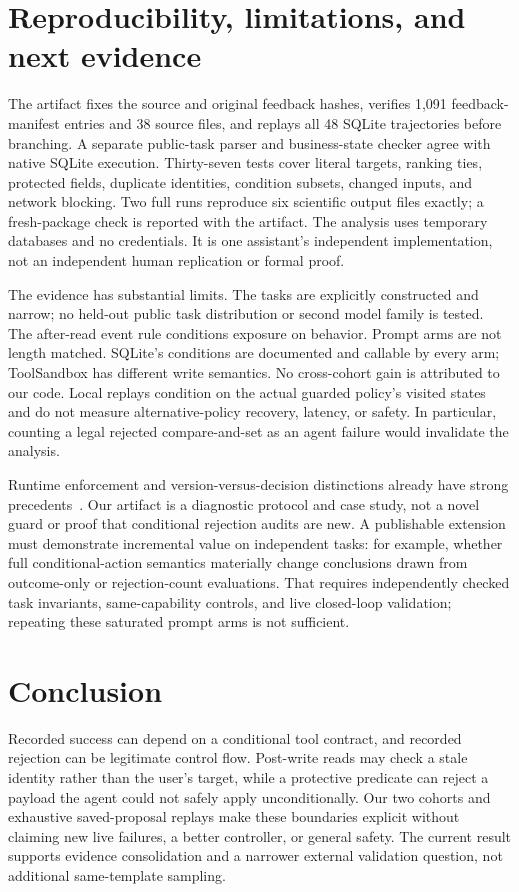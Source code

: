 \documentclass[10pt,letterpaper]{article}
\begin{document}
\section{Reproducibility, limitations, and next evidence}
The artifact fixes the source and original feedback hashes, verifies 1,091 feedback-manifest entries and 38 source files, and replays all 48 SQLite trajectories before branching. A separate public-task parser and business-state checker agree with native SQLite execution. Thirty-seven tests cover literal targets, ranking ties, protected fields, duplicate identities, condition subsets, changed inputs, and network blocking. Two full runs reproduce six scientific output files exactly; a fresh-package check is reported with the artifact. The analysis uses temporary databases and no credentials. It is one assistant's independent implementation, not an independent human replication or formal proof.

The evidence has substantial limits. The tasks are explicitly constructed and narrow; no held-out public task distribution or second model family is tested. The after-read event rule conditions exposure on behavior. Prompt arms are not length matched. SQLite's conditions are documented and callable by every arm; ToolSandbox has different write semantics. No cross-cohort gain is attributed to our code. Local replays condition on the actual guarded policy's visited states and do not measure alternative-policy recovery, latency, or safety. In particular, counting a legal rejected compare-and-set as an agent failure would invalidate the analysis.

Runtime enforcement and version-versus-decision distinctions already have strong precedents~\cite{agentspec,gates,atr}. Our artifact is a diagnostic protocol and case study, not a novel guard or proof that conditional rejection audits are new. A publishable extension must demonstrate incremental value on independent tasks: for example, whether full conditional-action semantics materially change conclusions drawn from outcome-only or rejection-count evaluations. That requires independently checked task invariants, same-capability controls, and live closed-loop validation; repeating these saturated prompt arms is not sufficient.

\section{Conclusion}
Recorded success can depend on a conditional tool contract, and recorded rejection can be legitimate control flow. Post-write reads may check a stale identity rather than the user's target, while a protective predicate can reject a payload the agent could not safely apply unconditionally. Our two cohorts and exhaustive saved-proposal replays make these boundaries explicit without claiming new live failures, a better controller, or general safety. The current result supports evidence consolidation and a narrower external validation question, not additional same-template sampling.
\end{document}
